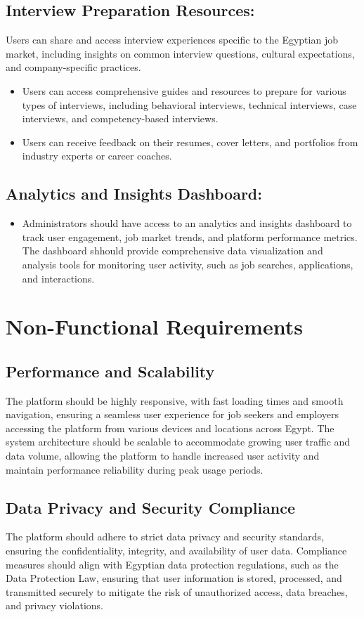 \documentclass[titlepage]{article}
\begin{document}
\subsection{Interview Preparation Resources:}
Users can share and access interview experiences specific to the Egyptian job market, including insights on common interview questions, cultural expectations, and company-specific practices.
\begin{itemize}
    \item Users can access comprehensive guides and resources to prepare for various types of interviews, including behavioral interviews, technical interviews, case interviews, and competency-based interviews.
    \item Users can receive feedback on their resumes, cover letters, and portfolios from industry experts or career coaches.
\end{itemize}

\subsection{Analytics and Insights Dashboard:}
\begin{itemize}
    \item Administrators should have access to an analytics and insights dashboard to track user engagement, job market trends, and platform performance metrics. The dashboard shhould provide comprehensive data visualization and analysis tools for monitoring user activity, such as job searches, applications, and interactions.
\end{itemize}
\section{Non-Functional Requirements}
\subsection{Performance and Scalability}

The platform   should be highly responsive, with fast loading times and smooth navigation, ensuring a seamless user experience for job seekers and employers accessing the platform from various devices and locations across Egypt.
The system architecture should be scalable to accommodate growing user traffic and data volume, allowing the platform to handle increased user activity and maintain performance reliability during peak usage periods.
\subsection{Data Privacy and Security Compliance}
The platform should adhere to strict data privacy and security standards, ensuring the confidentiality, integrity, and availability of user data.
Compliance measures should align with Egyptian data protection regulations, such as the Data Protection Law, ensuring that user information is stored, processed, and transmitted securely to mitigate the risk of unauthorized access, data breaches, and privacy violations.
\appendix
\end{document}
